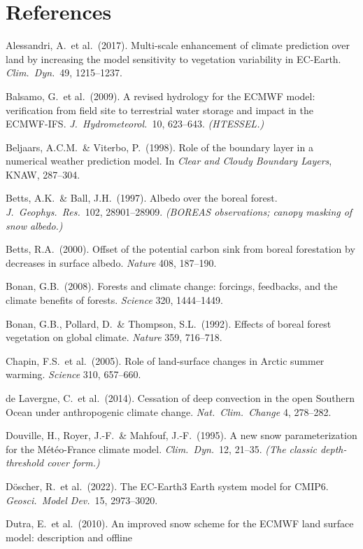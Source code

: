 \documentclass[10pt]{article}
\begin{document}
\section*{References}
{\footnotesize\setlength{\parindent}{0pt}\setlength{\parskip}{2.5pt}
Alessandri, A.\ et al.\ (2017). Multi-scale enhancement of climate prediction over land by increasing the model
sensitivity to vegetation variability in EC-Earth. \emph{Clim.\ Dyn.}\ 49, 1215--1237.\par
Balsamo, G.\ et al.\ (2009). A revised hydrology for the ECMWF model: verification from field site to terrestrial
water storage and impact in the ECMWF-IFS. \emph{J.\ Hydrometeorol.}\ 10, 623--643. \emph{(HTESSEL.)}\par
Beljaars, A.C.M.\ \& Viterbo, P.\ (1998). Role of the boundary layer in a numerical weather prediction model. In
\emph{Clear and Cloudy Boundary Layers}, KNAW, 287--304.\par
Betts, A.K.\ \& Ball, J.H.\ (1997). Albedo over the boreal forest. \emph{J.\ Geophys.\ Res.}\ 102,
28901--28909. \emph{(BOREAS observations; canopy masking of snow albedo.)}\par
Betts, R.A.\ (2000). Offset of the potential carbon sink from boreal forestation by decreases in surface albedo.
\emph{Nature} 408, 187--190.\par
Bonan, G.B.\ (2008). Forests and climate change: forcings, feedbacks, and the climate benefits of forests.
\emph{Science} 320, 1444--1449.\par
Bonan, G.B., Pollard, D.\ \& Thompson, S.L.\ (1992). Effects of boreal forest vegetation on global climate.
\emph{Nature} 359, 716--718.\par
Chapin, F.S.\ et al.\ (2005). Role of land-surface changes in Arctic summer warming. \emph{Science} 310, 657--660.\par
de Lavergne, C.\ et al.\ (2014). Cessation of deep convection in the open Southern Ocean under anthropogenic climate
change. \emph{Nat.\ Clim.\ Change} 4, 278--282.\par
Douville, H., Royer, J.-F.\ \& Mahfouf, J.-F.\ (1995). A new snow parameterization for the M\'et\'eo-France
climate model. \emph{Clim.\ Dyn.}\ 12, 21--35. \emph{(The classic depth-threshold cover form.)}\par
D\"oscher, R.\ et al.\ (2022). The EC-Earth3 Earth system model for CMIP6. \emph{Geosci.\ Model Dev.}\ 15,
2973--3020.\par
Dutra, E.\ et al.\ (2010). An improved snow scheme for the ECMWF land surface model: description and offline
}
\end{document}
